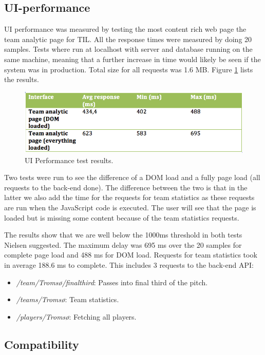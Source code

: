 \subsection{UI-performance}
UI performance was measured by testing the most content rich web page the team analytic page for \ac{TIL}. All the response times were measured by doing 20 samples. Tests where run at localhost with server and database running on the same machine, meaning that a further increase in time would likely be seen if the system was in production. Total size for all requests was 1.6 MB. Figure \ref{fig:uiperform} lists the results.

\begin{figure}[ht!]
\centering
\includegraphics[width=1\textwidth]{images/evaluation/uipeform}
\caption{UI Performance test results. }
\label{fig:uiperform}
\end{figure}

Two tests were run to see the difference of a \ac{DOM} load and a fully page load (all requests to the back-end done). The difference between the two is that in the latter we also add the time for the requests for team statistics as these requests are run when the JavaScript code is executed. The user will see that the page is loaded but is missing some content because of the team statistics requests.

The results show that we are well below the 1000ms threshold in both tests Nielsen \cite{nielsen} suggested. The maximum delay was 695 ms over the 20 samples for complete page load and 488 ms for \ac{DOM} load. Requests for team statistics took in average 188.6 ms to complete. This includes 3 requests to the back-end API:
\begin{itemize}
\item \emph{/team/Troms{\o}/finalthird}: Passes into final third of the pitch.
\item \emph{/teams/Troms{\o}}: Team statistics.
\item \emph{/players/Troms{\o}}: Fetching all players.
\end{itemize}


\subsection{Compatibility}

